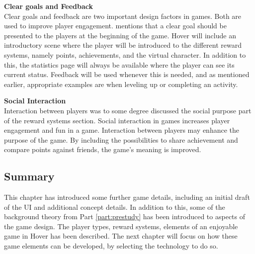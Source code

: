 \documentclass[../Main.tex]{subfiles}
\begin{document}
\textbf{Clear goals and Feedback}\\
Clear goals and feedback are two important design factors in games. Both are used to improve player engagement. \citeauthor{sweetser_gameflow_2005} mentions that a clear goal should be presented to the players at the beginning of the game. Hover will include an introductory scene where the player will be introduced to the different reward systems, namely points, achievements, and the virtual character. In addition to this, the statistics page will always be available where the player can see its current status. Feedback will be used whenever this is needed, and as mentioned earlier, appropriate examples are when leveling up or completing an activity.

\textbf{Social Interaction}\\
Interaction between players was to some degree discussed the social purpose part of the reward systems section. Social interaction in games increases player engagement and fun in a game. Interaction between players may enhance the purpose of the game. By including the possibilities to share achievement and compare points against friends, the game’s meaning is improved.

\subsection{Summary}
This chapter has introduced some further game details, including an initial draft of the UI and additional concept details. In addition to this, some of the background theory from Part \ref{part:prestudy} has been introduced to aspects of the game design. The player types, reward systems, elements of an enjoyable game in Hover has been described. The next chapter will focus on how these game elements can be developed, by selecting the technology to do so.

\biblio %
\end{document}
